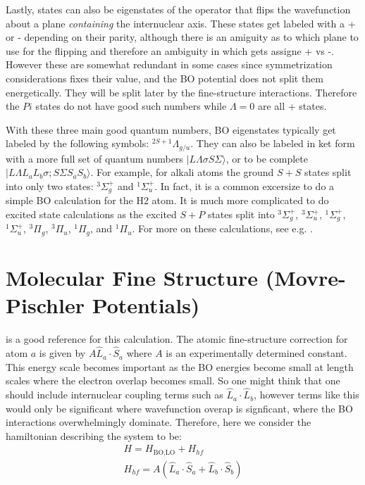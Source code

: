 \documentclass[prl, longbibliography]{revtex4-2}
\begin{document}
Lastly, states can also be eigenstates of the operator that flips the wavefunction about a plane \emph{containing} the internuclear axis. These states get labeled with a + or - depending on their parity, although there is an amiguity as to which plane to use for the flipping and therefore an ambiguity in which gets assigne + vs -\cite{lefebvre-brion_perturbations_1986}. However these are somewhat redundant in some cases since symmetrization considerations fixes their value, and the BO potential does not split them energetically. They will be split later by the fine-structure interactions. Therefore the $Pi$ states do not have good such numbers while $\Lambda=0$ are all + states. 

With these three main good quantum numbers, BO eigenstates typically get labeled by the following symbols: $^{2S+1}\Lambda_{g/u}$.
They can also be labeled in ket form with a more full set of quantum numbers $|L\Lambda\sigma S\Sigma\rangle$, or to be complete $|L\Lambda L_a L_b \sigma; S\Sigma S_a S_b\rangle$. 
For example, for alkali atoms the ground $S+S$ states split into only two states: $^3\Sigma^+_g$ and $^1\Sigma^+_u$. 
In fact, it is a common excersize to do a simple BO calculation for the H2 atom. It is much more complicated to do excited state calculations as the excited $S+P$ states split into $^3\Sigma^+_g$, $^3\Sigma^+_u$, $^1\Sigma^+_g$, $^1\Sigma^+_u$, $^3\Pi_g$, $^3\Pi_u$, $^1\Pi_g$, and $^1\Pi_u$. For more on these calculations, see e.g. \cite{magnier_potential_1993}. 

\section{Molecular Fine Structure (Movre-Pischler Potentials)}

\cite{bergeman_predissociations_2002} is a good reference for this calculation. The atomic fine-structure correction for atom $a$ is given by $A \hat{L}_a\cdot\hat{S}_a$ where $A$ is an experimentally determined constant. This energy scale becomes important as the BO energies become small at length scales where the electron overlap becomes small. So one might think that one should include internuclear coupling terms such as $\hat{L}_a\cdot\hat{L}_b$, however terms like this would only be significant where wavefunction overap is signficant, where the BO interactions overwhelmingly dominate. Therefore, here we consider the hamiltonian describing the system to be:
\begin{align}
H = H_{\text{BO,LO}} + H_{hf} \\
H_{hf}=A(\hat{L}_a\cdot\hat{S}_a+\hat{L}_b\cdot\hat{S}_b)
\end{align}
\end{document}

